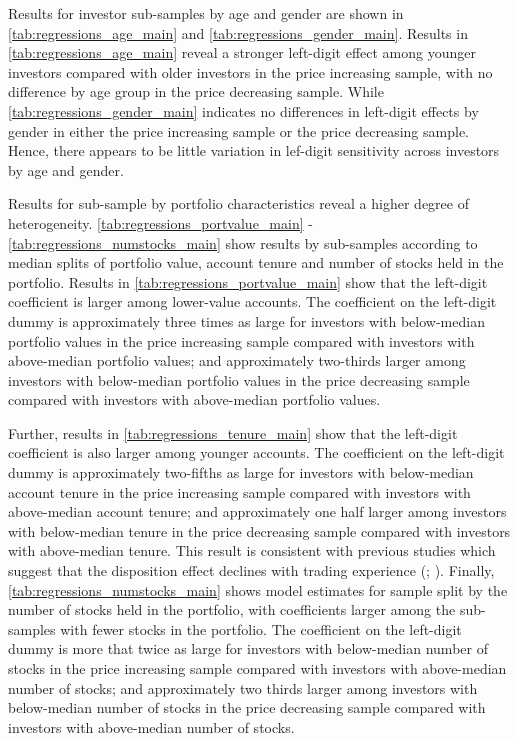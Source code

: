 Results for investor sub-samples by age and gender are shown in \ref{tab:regressions_age_main} and \ref{tab:regressions_gender_main}. Results in \ref{tab:regressions_age_main} reveal a stronger left-digit effect among younger investors compared with older investors in the price increasing sample, with no difference by age group in the price decreasing sample. While \ref{tab:regressions_gender_main} indicates no differences in left-digit effects by gender in either the price increasing sample or the price decreasing sample. Hence, there appears to be little variation in lef-digit sensitivity across investors by age and gender.

Results for sub-sample by portfolio characteristics reveal a higher degree of heterogeneity. \ref{tab:regressions_portvalue_main} - \ref{tab:regressions_numstocks_main} show results by sub-samples according to median splits of portfolio value, account tenure and number of stocks held in the portfolio. Results in \ref{tab:regressions_portvalue_main} show that the left-digit coefficient is larger among lower-value accounts. The coefficient on the left-digit dummy is approximately three times as large for investors with below-median portfolio values in the price increasing sample compared with investors with above-median portfolio values; and approximately two-thirds larger among investors with below-median portfolio values in the price decreasing sample compared with investors with above-median portfolio values.

Further, results in \ref{tab:regressions_tenure_main} show that the left-digit coefficient is also larger among younger accounts. The coefficient on the left-digit dummy is approximately two-fifths as large for investors with below-median account tenure in the price increasing sample compared with investors with above-median account tenure; and approximately one half larger among investors with below-median tenure in the price decreasing sample compared with investors with above-median tenure. This result is consistent with previous studies which suggest that the disposition effect declines with trading experience (\citealp{feng2005}; \citealp{seru2010}). Finally, \ref{tab:regressions_numstocks_main} shows model estimates for sample split by the number of stocks held in the portfolio, with coefficients larger among the sub-samples with fewer stocks in the portfolio. The coefficient on the left-digit dummy is more that twice as large for investors with below-median number of stocks in the price increasing sample compared with investors with above-median number of stocks; and approximately two thirds larger among investors with below-median number of stocks in the price decreasing sample compared with investors with above-median number of stocks. 




